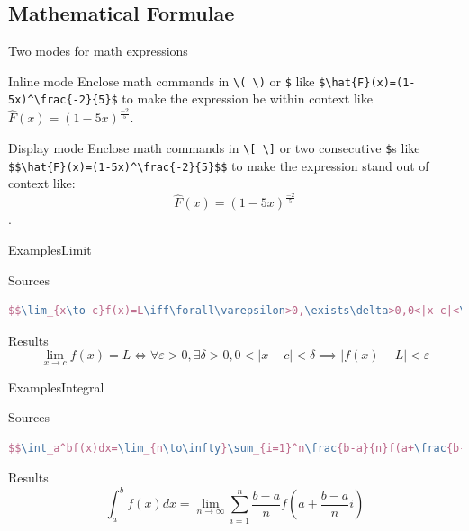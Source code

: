 \documentclass[mathserif]{beamer}
\begin{document}
\subsection{Mathematical Formulae}

\begin{frame}[fragile]{Two modes for math expressions}{}

\begin{block}{Inline mode}
Enclose math commands in \verb|\( \)| or \texttt{\$} like \verb|$\hat{F}(x)=(1-5x)^\frac{-2}{5}$| to make the expression be within context like $\hat{F}(x)=(1-5x)^\frac{-2}{5}$.
\end{block}

\begin{block}{Display mode}
Enclose math commands in \verb|\[ \]| or two consecutive \texttt{\$}s like \verb|$$\hat{F}(x)=(1-5x)^\frac{-2}{5}$$| to make the expression stand out of context like: $$\hat{F}(x)=(1-5x)^\frac{-2}{5}$$.
\end{block}

\end{frame}

\begin{frame}[fragile]{Examples}{Limit}
\begin{alertblock}{Sources}
\small
\begin{lstlisting}[language=TeX]
$$\lim_{x\to c}f(x)=L\iff\forall\varepsilon>0,\exists\delta>0,0<|x-c|<\delta\implies|f(x)-L|<\varepsilon$$
\end{lstlisting}
\end{alertblock}
\begin{exampleblock}{Results}
$$\lim_{x\to c}f(x)=L\iff\forall\varepsilon>0,\exists\delta>0,0<|x-c|<\delta\implies|f(x)-L|<\varepsilon$$
\end{exampleblock}
\end{frame}

\begin{frame}[fragile]{Examples}{Integral}
\begin{alertblock}{Sources}
\begin{lstlisting}[language=TeX]
$$\int_a^bf(x)dx=\lim_{n\to\infty}\sum_{i=1}^n\frac{b-a}{n}f(a+\frac{b-a}{n}i)$$
\end{lstlisting}
\end{alertblock}
\begin{exampleblock}{Results}
$$\int_a^bf(x)dx=\lim_{n\to\infty}\sum_{i=1}^n\frac{b-a}{n}f(a+\frac{b-a}{n}i)$$
\end{exampleblock}
\end{frame}
\end{document}
